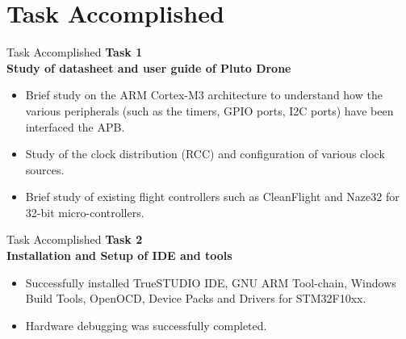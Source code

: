 \documentclass[10pt, a4paper]{beamer}
\begin{document}
\section{Task Accomplished}
\begin{frame}{Task Accomplished}
\bfseries Task 1\\ Study of datasheet and user guide of Pluto Drone\\ \hfill \break
\mdseries 
\begin{itemize}
\item Brief study on the ARM Cortex-M3 architecture to understand how the various peripherals (such as the timers, GPIO ports, I2C ports) have been interfaced the APB.\\ 
\item Study of the clock distribution (RCC) and configuration of various clock sources.\\
\item Brief study of existing flight controllers such as CleanFlight  and Naze32 for 32-bit micro-controllers.
\end{itemize}	
\end{frame}

\begin{frame}{Task Accomplished}
\bfseries Task 2\\ Installation and Setup of IDE and tools\\ \hfill \break
\mdseries 
\begin{itemize}
\item Successfully installed TrueSTUDIO IDE, GNU ARM Tool-chain, Windows Build Tools, OpenOCD, Device Packs and Drivers for STM32F10xx.\\
\item Hardware debugging was successfully completed.
\end{itemize}	
\end{frame}
\end{document}
